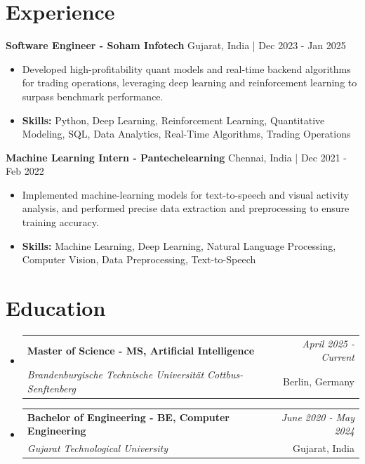 \documentclass[a4paper,11pt]{article}
\makeatletter
\newcommand{\resumeSubheading}[4]{
\vspace{0.5mm}\item
    \begin{tabular*}{\linewidth}[t]{l@{\extracolsep{\fill}}r}
        \textbf{#1} & \textit{\footnotesize{#4}} \\
        \textit{\footnotesize{#3}} &  \footnotesize{#2}\\
    \end{tabular*}
    \vspace{-2.4mm}
}
\makeatother
\begin{document}
\section{\textbf{Experience}}


\vspace{1mm}
  \textbf{Software Engineer - Soham Infotech} \hfill Gujarat, India | Dec 2023 - Jan 2025
\vspace{-1.5mm} %
\begin{itemize}
  \item Developed high-profitability quant models and real-time backend algorithms for trading operations, leveraging deep learning and reinforcement learning to surpass benchmark performance.

\vspace{-2mm}
  \item \textbf{Skills:} Python, Deep Learning, Reinforcement Learning, Quantitative Modeling, SQL, Data Analytics, Real-Time Algorithms, Trading Operations
\end{itemize}

\vspace{1mm}
  \textbf{Machine Learning Intern - Pantechelearning} \hfill Chennai, India | Dec 2021 - Feb 2022
\vspace{-1.5mm} %
\begin{itemize}
  \item Implemented machine-learning models for text-to-speech and visual activity analysis, and performed precise data extraction and preprocessing to ensure training accuracy.
\vspace{-2mm}
  \item \textbf{Skills:} Machine Learning, Deep Learning, Natural Language Processing, Computer Vision, Data Preprocessing, Text-to-Speech
\end{itemize}\section{\textbf{Education}}
\vspace{-0.4mm}

\begin{itemize}[leftmargin=0.15in, label={}]
\resumeSubheading
{Master of Science - MS, Artificial Intelligence }{Berlin, Germany}
{Brandenburgische Technische Universität Cottbus-Senftenberg  }{April 2025 - Current}

\vspace{1.0mm} %
\resumeSubheading
{Bachelor of Engineering - BE, Computer Engineering  }{Gujarat, India}
{Gujarat Technological University }{June 2020 - May 2024}

\end{itemize}
\end{document}
